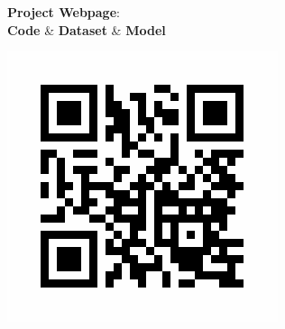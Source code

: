 \documentclass[landscape,a0paper,fontscale=0.292]{baposter}
\begin{document}
\begin{poster}
{\begin{minipage}[t]{0.5\linewidth}
        \hfill\begin{minipage}{0.46\linewidth}
            \begin{center}
            \textbf{Project Webpage}: \\
            \vspace{0.5em}\textbf{Code} \& \textbf{Dataset} \& \textbf{Model}
            \end{center}
        \end{minipage}
        \begin{minipage}{0.24\linewidth}
            \begin{center}
                \includegraphics[width=\linewidth]{images/frame.png}
            \end{center}
        \end{minipage}
    \end{minipage}
}


\end{poster}
\end{document}
